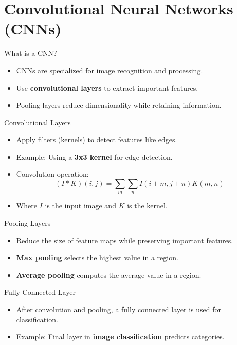 \documentclass{beamer}
\begin{document}
\section{Convolutional Neural Networks (CNNs)}
\begin{frame}{What is a CNN?}
    \begin{itemize}
        \item CNNs are specialized for image recognition and processing.
        \item Use \textbf{convolutional layers} to extract important features.
        \item Pooling layers reduce dimensionality while retaining information.
    \end{itemize}
\end{frame}

\begin{frame}{Convolutional Layers}
    \begin{itemize}
        \item Apply filters (kernels) to detect features like edges.
        \item Example: Using a \textbf{3x3 kernel} for edge detection.
        \item Convolution operation:
        \[
        (I * K)(i, j) = \sum_m \sum_n I(i+m, j+n) K(m, n)
        \]
        \item Where \(I\) is the input image and \(K\) is the kernel.
    \end{itemize}
\end{frame}

\begin{frame}{Pooling Layers}
    \begin{itemize}
        \item Reduce the size of feature maps while preserving important features.
        \item \textbf{Max pooling} selects the highest value in a region.
        \item \textbf{Average pooling} computes the average value in a region.
    \end{itemize}
\end{frame}

\begin{frame}{Fully Connected Layer}
    \begin{itemize}
        \item After convolution and pooling, a fully connected layer is used for classification.
        \item Example: Final layer in \textbf{image classification} predicts categories.
    \end{itemize}
\end{frame}
\end{document}
